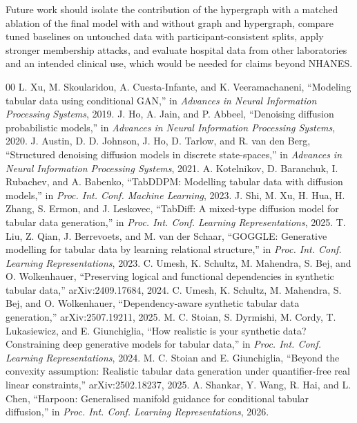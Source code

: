 \documentclass[conference]{IEEEtran}
\begin{document}
Future work should isolate the contribution of the hypergraph with a matched ablation of the final model with and without graph and hypergraph, compare tuned baselines on untouched data with participant-consistent splits, apply stronger membership attacks, and evaluate hospital data from other laboratories and an intended clinical use, which would be needed for claims beyond NHANES.

\begin{thebibliography}{00}
 L. Xu, M. Skoularidou, A. Cuesta-Infante, and K. Veeramachaneni, ``Modeling tabular data using conditional GAN,'' in \textit{Advances in Neural Information Processing Systems}, 2019.
 J. Ho, A. Jain, and P. Abbeel, ``Denoising diffusion probabilistic models,'' in \textit{Advances in Neural Information Processing Systems}, 2020.
 J. Austin, D. D. Johnson, J. Ho, D. Tarlow, and R. van den Berg, ``Structured denoising diffusion models in discrete state-spaces,'' in \textit{Advances in Neural Information Processing Systems}, 2021.
 A. Kotelnikov, D. Baranchuk, I. Rubachev, and A. Babenko, ``TabDDPM: Modelling tabular data with diffusion models,'' in \textit{Proc. Int. Conf. Machine Learning}, 2023.
 J. Shi, M. Xu, H. Hua, H. Zhang, S. Ermon, and J. Leskovec, ``TabDiff: A mixed-type diffusion model for tabular data generation,'' in \textit{Proc. Int. Conf. Learning Representations}, 2025.
 T. Liu, Z. Qian, J. Berrevoets, and M. van der Schaar, ``GOGGLE: Generative modelling for tabular data by learning relational structure,'' in \textit{Proc. Int. Conf. Learning Representations}, 2023.
 C. Umesh, K. Schultz, M. Mahendra, S. Bej, and O. Wolkenhauer, ``Preserving logical and functional dependencies in synthetic tabular data,'' arXiv:2409.17684, 2024.
 C. Umesh, K. Schultz, M. Mahendra, S. Bej, and O. Wolkenhauer, ``Dependency-aware synthetic tabular data generation,'' arXiv:2507.19211, 2025.
 M. C. Stoian, S. Dyrmishi, M. Cordy, T. Lukasiewicz, and E. Giunchiglia, ``How realistic is your synthetic data? Constraining deep generative models for tabular data,'' in \textit{Proc. Int. Conf. Learning Representations}, 2024.
 M. C. Stoian and E. Giunchiglia, ``Beyond the convexity assumption: Realistic tabular data generation under quantifier-free real linear constraints,'' arXiv:2502.18237, 2025.
 A. Shankar, Y. Wang, R. Hai, and L. Chen, ``Harpoon: Generalised manifold guidance for conditional tabular diffusion,'' in \textit{Proc. Int. Conf. Learning Representations}, 2026.

\end{thebibliography}
\end{document}
